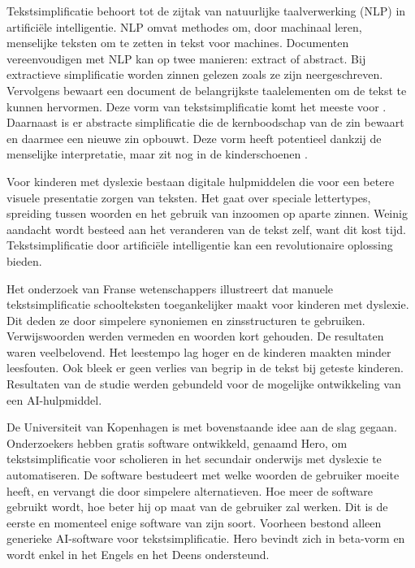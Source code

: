 Tekstsimplificatie behoort tot de zijtak van natuurlijke taalverwerking (NLP) in artificiële intelligentie. NLP omvat methodes om, door machinaal leren, menselijke teksten om te zetten in tekst voor machines. Documenten vereenvoudigen met NLP kan op twee manieren: extract of abstract. Bij extractieve simplificatie worden zinnen gelezen zoals ze zijn neergeschreven. Vervolgens bewaart een document de belangrijkste taalelementen om de tekst te kunnen hervormen. Deze vorm van tekstsimplificatie komt het meeste voor \autocite{Sciforce2020}. Daarnaast is er abstracte simplificatie die de kernboodschap van de zin bewaart en daarmee een nieuwe zin opbouwt. Deze vorm heeft potentieel dankzij de menselijke interpretatie, maar zit nog in de kinderschoenen \autocite{Chowdhary2020}.

Voor kinderen met dyslexie bestaan digitale hulpmiddelen die voor een betere visuele presentatie zorgen van teksten. Het gaat over speciale lettertypes, spreiding tussen woorden en het gebruik van inzoomen op aparte zinnen. Weinig aandacht wordt besteed aan het veranderen van de tekst zelf, want dit kost tijd. Tekstsimplificatie door artificiële intelligentie kan een revolutionaire oplossing bieden. 

Het onderzoek van Franse wetenschappers \newline \textcite{Gala2016} illustreert dat manuele tekstsimplificatie schoolteksten toegankelijker maakt voor kinderen met dyslexie. Dit deden ze door simpelere synoniemen en zinsstructuren te gebruiken. Verwijswoorden werden vermeden en woorden kort gehouden. De resultaten waren veelbelovend. Het leestempo lag hoger en de kinderen maakten minder leesfouten. Ook bleek er geen verlies van begrip in de tekst bij geteste kinderen. Resultaten van de studie werden gebundeld voor de mogelijke ontwikkeling van een AI-hulpmiddel.

De Universiteit van Kopenhagen is met bovenstaande idee aan de slag gegaan. Onderzoekers \textcite{Bingel2018} hebben gratis software ontwikkeld, genaamd Hero, om tekstsimplificatie voor scholieren in het secundair onderwijs met dyslexie te automatiseren. De software bestudeert met welke woorden de gebruiker moeite heeft, en vervangt die door simpelere alternatieven. Hoe meer de software gebruikt wordt, hoe beter hij op maat van de gebruiker zal werken. Dit is de eerste en momenteel enige software van zijn soort. Voorheen bestond alleen generieke AI-software voor tekstsimplificatie. Hero bevindt zich in beta-vorm en wordt enkel in het Engels en het Deens ondersteund. 

